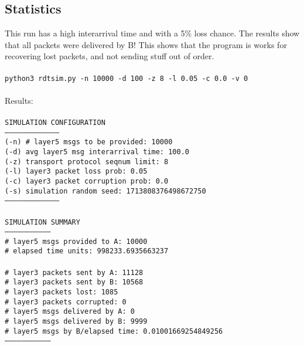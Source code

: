 \documentclass{article}
\begin{document}
\subsection{Statistics}
This run has a high interarrival time and with a 5\% loss chance. The results show that all packets were delivered by B! This shows that the program is works for recovering lost packets, and not sending stuff out of order.
\\\\
\hspace*{10mm} \texttt{python3 rdtsim.py -n 10000 -d 100 -z 8 -l 0.05 -c 0.0 -v 0}\\\\
Results: \\
\texttt{\\
SIMULATION CONFIGURATION\\
--------------------------------------\\
(-n) \# layer5 msgs to be provided:      10000\\
(-d) avg layer5 msg interarrival time:  100.0\\
(-z) transport protocol seqnum limit:   8\\
(-l) layer3 packet loss prob:           0.05\\
(-c) layer3 packet corruption prob:     0.0\\
(-s) simulation random seed:            1713808376498672750\\
--------------------------------------\\
\\
SIMULATION SUMMARY\\
--------------------------------\\
\# layer5 msgs provided to A:      10000\\
\# elapsed time units:             998233.6935663237\\
\\
\# layer3 packets sent by A:       11128\\
\# layer3 packets sent by B:       10568\\
\# layer3 packets lost:            1085\\
\# layer3 packets corrupted:       0\\
\# layer5 msgs delivered by A:     0\\
\# layer5 msgs delivered by B:     9999\\
\# layer5 msgs by B/elapsed time:  0.01001669254849256\\
--------------------------------\\}
\end{document}
